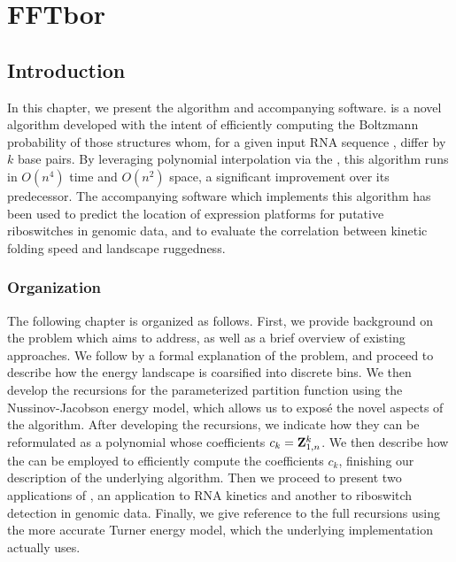
\chapter{FFTbor}
\label{ch:fftbor}


\section{Introduction}
\label{sec:fftbor:intro}

In this chapter, we present the \fftbor algorithm and accompanying software.
\fftbor is a novel algorithm developed with the intent of efficiently computing
the Boltzmann probability of those structures whom, for a given input RNA
sequence \seq, differ by $k$ base pairs. By leveraging polynomial interpolation
via the \fft, this algorithm runs in $O(n^4)$ time and
$O(n^2)$ space, a significant improvement over its predecessor. The accompanying
software which implements this algorithm has been used to predict the location
of expression platforms for putative riboswitches in genomic data, and to
evaluate the correlation between kinetic folding speed and landscape ruggedness.

\subsection{Organization}
\label{subsec:fftbor:org}

The following chapter is organized as follows. First, we provide background on
the problem which \fftbor aims to address, as well as a brief overview of
existing approaches. We follow by a formal explanation of the problem, and
proceed to describe how the energy landscape is coarsified into discrete bins.
We then develop the recursions for the parameterized partition function using
the Nussinov-Jacobson energy model, which allows us to exposé the novel aspects
of the algorithm. After developing the recursions, we indicate how they can be
reformulated as a polynomial whose coefficients $c_k={\bf Z}^{k}_{1,n}$. We then
describe how the \fft can be employed to efficiently compute the coefficients
$c_k$, finishing our description of the underlying algorithm. Then we proceed
to present two applications of \fftbor, an application to RNA kinetics and
another to riboswitch detection in genomic data. Finally, we give reference
to the full recursions using the more accurate Turner energy model, which the
underlying implementation actually uses.

